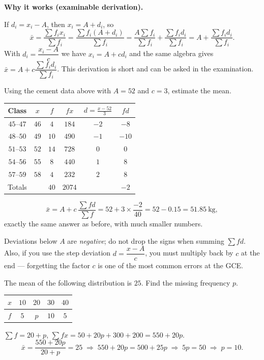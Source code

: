 \documentclass[11pt]{article}
\begin{document}
\textbf{Why it works (examinable derivation).}\par
If $d_i = x_i - A$, then $x_i = A + d_i$, so
\[
\bar{x}=\frac{\sum f_i x_i}{\sum f_i}=\frac{\sum f_i (A+d_i)}{\sum f_i}
=\frac{A\sum f_i}{\sum f_i}+\frac{\sum f_i d_i}{\sum f_i}
=A+\frac{\sum f_i d_i}{\sum f_i}.
\]
With $d_i = \dfrac{x_i-A}{c}$ we have $x_i = A + c d_i$ and the same algebra gives $\bar{x}=A+c\dfrac{\sum f_i d_i}{\sum f_i}$. This derivation is short and can be asked in the examination.

\begin{exoresolu}
Using the cement data above with $A=52$ and $c=3$, estimate the mean.
\tcblower
\begin{center}
\begin{tabular}{|c|c|c|c|c|c|}
\hline
\rowcolor{popblueL} Class & $x$ & $f$ & $fx$ & $d=\frac{x-52}{3}$ & $fd$ \\
\hline
$45$--$47$ & $46$ & $4$ & $184$ & $-2$ & $-8$ \\
$48$--$50$ & $49$ & $10$ & $490$ & $-1$ & $-10$ \\
$51$--$53$ & $52$ & $14$ & $728$ & $0$ & $0$ \\
$54$--$56$ & $55$ & $8$ & $440$ & $1$ & $8$ \\
$57$--$59$ & $58$ & $4$ & $232$ & $2$ & $8$ \\
\hline
Totals & & $40$ & $2074$ & & $-2$ \\
\hline
\end{tabular}
\end{center}
\[
\bar{x}=A+c\,\frac{\sum fd}{\sum f}=52+3\times\frac{-2}{40}=52-0.15=51.85\ \mathrm{kg},
\]
exactly the same answer as before, with much smaller numbers.
\end{exoresolu}

\begin{attention}
Deviations below $A$ are \emph{negative}; do not drop the signs when summing $\sum fd$. Also, if you use the step deviation $d=\dfrac{x-A}{c}$, you must multiply back by $c$ at the end --- forgetting the factor $c$ is one of the most common errors at the GCE.
\end{attention}

\begin{exoresolu}
The mean of the following distribution is $25$. Find the missing frequency $p$.
\begin{center}
\begin{tabular}{|c|cccc|}
\hline
\rowcolor{popblueL} $x$ & $10$ & $20$ & $30$ & $40$ \\
\hline
$f$ & $5$ & $p$ & $10$ & $5$ \\
\hline
\end{tabular}
\end{center}
\tcblower
$\sum f = 20+p$, $\sum fx = 50 + 20p + 300 + 200 = 550 + 20p$.
\[
\bar{x} = \frac{550+20p}{20+p} = 25
\;\Longrightarrow\;
550+20p = 500 + 25p
\;\Longrightarrow\;
5p = 50
\;\Longrightarrow\;
p = 10.
\]
\end{exoresolu}
\end{document}
